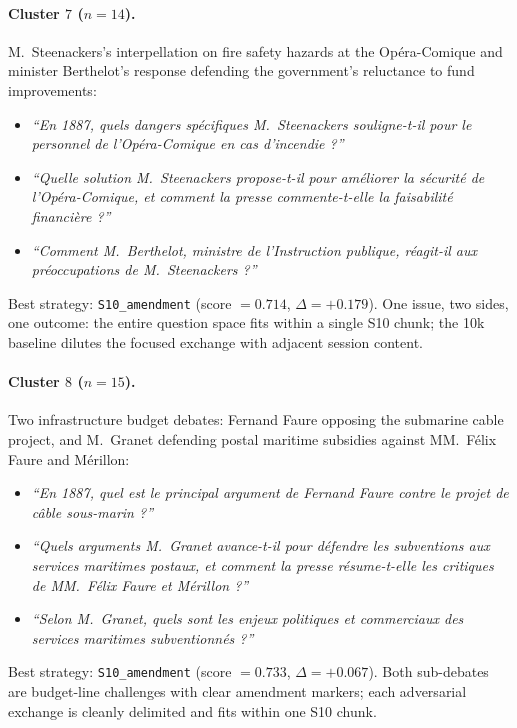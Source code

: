 \paragraph{Cluster $7$ ($n=14$).}
M.~Steenackers's interpellation on fire safety hazards at the Op\'{e}ra-Comique
and minister Berthelot's response defending the government's reluctance to fund
improvements:
\begin{itemize}
  \item \textit{``En 1887, quels dangers sp\'{e}cifiques M.~Steenackers
    souligne-t-il pour le personnel de l'Op\'{e}ra-Comique en cas d'incendie ?''}
  \item \textit{``Quelle solution M.~Steenackers propose-t-il pour am\'{e}liorer
    la s\'{e}curit\'{e} de l'Op\'{e}ra-Comique, et comment la presse
    commente-t-elle la faisabilit\'{e} financi\`{e}re ?''}
  \item \textit{``Comment M.~Berthelot, ministre de l'Instruction publique,
    r\'{e}agit-il aux pr\'{e}occupations de M.~Steenackers ?''}
\end{itemize}
Best strategy: \texttt{S10\_amendment} (score $= 0.714$, $\Delta = +0.179$).
One issue, two sides, one outcome: the entire question space fits within a single
S10 chunk; the 10k baseline dilutes the focused exchange with adjacent session
content.

\paragraph{Cluster $8$ ($n=15$).}
Two infrastructure budget debates: Fernand Faure opposing the submarine cable
project, and M.~Granet defending postal maritime subsidies against
MM.~F\'{e}lix Faure and M\'{e}rillon:
\begin{itemize}
  \item \textit{``En 1887, quel est le principal argument de Fernand Faure contre
    le projet de c\^{a}ble sous-marin ?''}
  \item \textit{``Quels arguments M.~Granet avance-t-il pour d\'{e}fendre les
    subventions aux services maritimes postaux, et comment la presse
    r\'{e}sume-t-elle les critiques de MM.~F\'{e}lix Faure et M\'{e}rillon ?''}
  \item \textit{``Selon M.~Granet, quels sont les enjeux politiques et commerciaux
    des services maritimes subventionn\'{e}s ?''}
\end{itemize}
Best strategy: \texttt{S10\_amendment} (score $= 0.733$, $\Delta = +0.067$).
Both sub-debates are budget-line challenges with clear amendment markers; each
adversarial exchange is cleanly delimited and fits within one S10 chunk.

